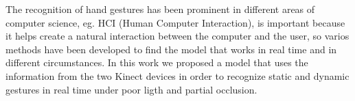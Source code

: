 The recognition of hand gestures has been prominent in different areas of computer science, eg. HCI (Human Computer Interaction), is important because it helps create a natural interaction between the computer and the user, so varios methods have been developed to find the model that works in real time and in different circumstances. In this work we proposed a model that uses the information from the two Kinect devices in order to recognize static and dynamic gestures in real time under poor ligth and partial occlusion.    